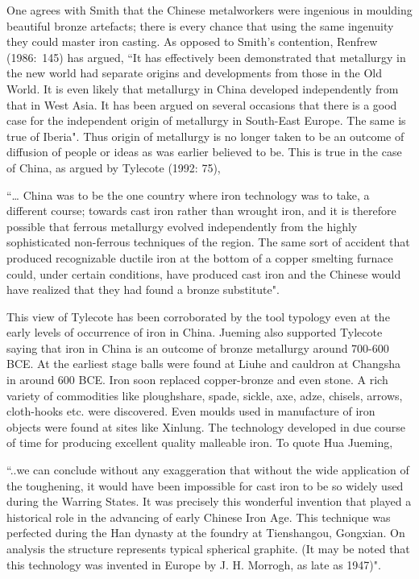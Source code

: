 One agrees with Smith that the Chinese metalworkers were ingenious in moulding beautiful bronze artefacts; there is every chance that using the same ingenuity they could master iron casting. As opposed to Smith's contention, Renfrew (1986:~145) has argued, “It has effectively been demonstrated that metallurgy in the new world had separate origins and developments from those in the Old World. It is even likely that metallurgy in China developed independently from that in West Asia. It has been argued on several occasions that there is a good case for the independent origin of metallurgy in South-East Europe. The same is true of Iberia". Thus origin of metallurgy is no longer taken to be an outcome of diffusion of people or ideas as was earlier believed to be. This is true in the case of China, as argued by Tylecote (1992: 75),

{\footnotesize “… China was to be the one country where iron technology was to take, a different course; towards cast iron rather than wrought iron, and it is therefore possible that ferrous metallurgy evolved independently from the highly sophisticated non-ferrous techniques of the region. The same sort of accident that produced recognizable ductile iron at the bottom of a copper smelting furnace could, under certain conditions, have produced cast iron and the Chinese would have realized that they had found a bronze substitute". }

\newpage

This view of Tylecote has been corroborated by the tool typology even at the early levels of occurrence of iron in China. Jueming also supported Tylecote saying that iron in China is an outcome of bronze metallurgy around 700-600 BCE. At the earliest stage balls were found at Liuhe and cauldron at Changsha in around 600 BCE. Iron soon replaced copper-bronze and even stone. A rich variety of commodities like ploughshare, spade, sickle, axe, adze, chisels, arrows, cloth-hooks etc. were discovered. Even moulds used in manufacture of iron objects were found at sites like Xinlung. The technology developed in due course of time for producing excellent quality malleable iron. To quote Hua Jueming, 

{\footnotesize “..we can conclude without any exaggeration that without the wide application of the toughening, it would have been impossible for cast iron to be so widely used during the Warring States. It was precisely this wonderful invention that played a historical role in the advancing of early Chinese Iron Age. This technique was perfected during the Han dynasty at the foundry at Tienshangou, Gongxian. On analysis the structure represents typical spherical graphite. (It may be noted that this technology was invented in Europe by J. H. Morrogh, as late as 1947)".}

